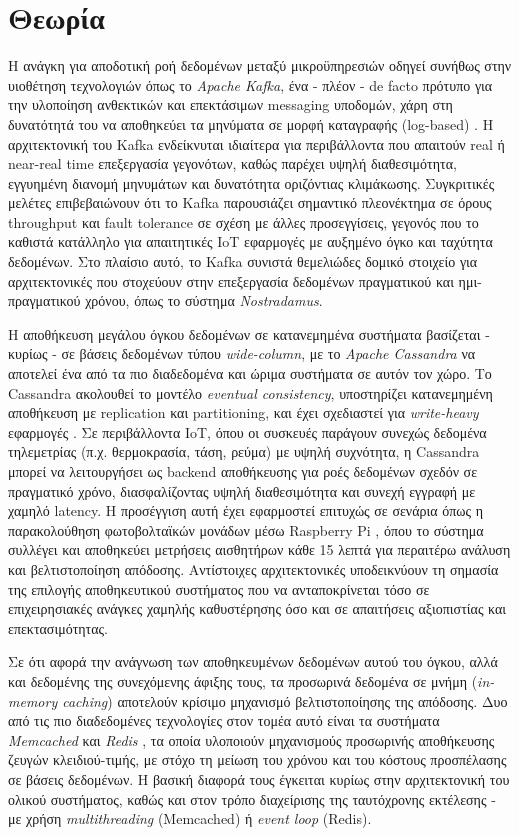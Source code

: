 \chapter{Θεωρία}

Η ανάγκη για αποδοτική ροή δεδομένων μεταξύ μικροϋπηρεσιών οδηγεί συνήθως στην υιοθέτηση τεχνολογιών όπως το \textit{Apache Kafka}, ένα - πλέον - de facto πρότυπο για την υλοποίηση ανθεκτικών και επεκτάσιμων messaging υποδομών, χάρη στη δυνατότητά του να αποθηκεύει τα μηνύματα σε μορφή καταγραφής (log-based) \cite{kafkabdd}. Η αρχιτεκτονική του Kafka ενδείκνυται ιδιαίτερα για περιβάλλοντα που απαιτούν real ή near-real time επεξεργασία γεγονότων, καθώς παρέχει υψηλή διαθεσιμότητα, εγγυημένη διανομή μηνυμάτων και δυνατότητα οριζόντιας κλιμάκωσης. Συγκριτικές μελέτες \cite{rtkafka} επιβεβαιώνουν ότι το Kafka παρουσιάζει σημαντικό πλεονέκτημα σε όρους throughput και fault tolerance σε σχέση με άλλες προσεγγίσεις, γεγονός που το καθιστά κατάλληλο για απαιτητικές IoT εφαρμογές με αυξημένο όγκο και ταχύτητα δεδομένων. Στο πλαίσιο αυτό, το Kafka συνιστά θεμελιώδες δομικό στοιχείο για αρχιτεκτονικές που στοχεύουν στην επεξεργασία δεδομένων πραγματικού και ημι-πραγματικού χρόνου, όπως το σύστημα \textit{Nostradamus}.

Η αποθήκευση μεγάλου όγκου δεδομένων σε κατανεμημένα συστήματα βασίζεται - κυρίως - σε βάσεις δεδομένων τύπου \textit{wide-column}, με το \textit{Apache Cassandra} να αποτελεί ένα από τα πιο διαδεδομένα και ώριμα συστήματα σε αυτόν τον χώρο. Το Cassandra ακολουθεί το μοντέλο \textit{eventual consistency}, υποστηρίζει κατανεμημένη αποθήκευση με replication και partitioning, και έχει σχεδιαστεί για \textit{write-heavy} εφαρμογές \cite{cassandrawp}. Σε περιβάλλοντα IoT, όπου οι συσκευές παράγουν συνεχώς δεδομένα τηλεμετρίας (π.χ. θερμοκρασία, τάση, ρεύμα) με υψηλή συχνότητα, η Cassandra μπορεί να λειτουργήσει ως backend αποθήκευσης για ροές δεδομένων σχεδόν σε πραγματικό χρόνο, διασφαλίζοντας υψηλή διαθεσιμότητα και συνεχή εγγραφή με χαμηλό latency. Η προσέγγιση αυτή έχει εφαρμοστεί επιτυχώς σε σενάρια όπως η παρακολούθηση φωτοβολταϊκών μονάδων μέσω Raspberry Pi \cite{iotcassandra}, όπου το σύστημα συλλέγει και αποθηκεύει μετρήσεις αισθητήρων κάθε 15 λεπτά για περαιτέρω ανάλυση και βελτιστοποίηση απόδοσης. Αντίστοιχες αρχιτεκτονικές υποδεικνύουν τη σημασία της επιλογής αποθηκευτικού συστήματος που να ανταποκρίνεται τόσο σε επιχειρησιακές ανάγκες χαμηλής καθυστέρησης όσο και σε απαιτήσεις αξιοπιστίας και επεκτασιμότητας.

Σε ότι αφορά την ανάγνωση των αποθηκευμένων δεδομένων αυτού του όγκου, αλλά και δεδομένης της συνεχόμενης άφιξης τους, τα προσωρινά δεδομένα σε μνήμη (\textit{in-memory caching}) αποτελούν κρίσιμο μηχανισμό βελτιστοποίησης της απόδοσης. Δυο από τις πιο διαδεδομένες τεχνολογίες στον τομέα αυτό είναι τα συστήματα \textit{Memcached} \cite{memcachedfb} και \textit{Redis} \cite{redisia}, τα οποία υλοποιούν μηχανισμούς προσωρινής αποθήκευσης ζευγών κλειδιού-τιμής, με στόχο τη μείωση του χρόνου και του κόστους προσπέλασης σε βάσεις δεδομένων. Η βασική διαφορά τους έγκειται κυρίως στην αρχιτεκτονική του ολικού συστήματος, καθώς και στον τρόπο διαχείρισης της ταυτόχρονης εκτέλεσης - με χρήση \textit{multithreading} (Memcached) ή \textit{event loop} (Redis).


